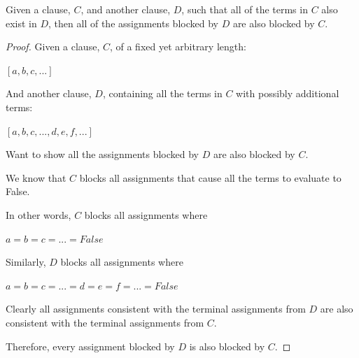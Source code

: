 \documentclass[manuscript]{acmart}
\begin{document}
    \begin{lemma}
        Given a clause, $C$, and another clause, $D$, such that all of the 
        terms in $C$ also exist in $D$, then all of the assignments
        blocked by $D$ are also blocked by $C$.
    \end{lemma}
    \begin{proof}
        Given a clause, $C$, of a fixed yet arbitrary length:

        $[a, b, c, ...]$

        And another clause, $D$, containing all the terms in $C$ with possibly
        additional terms:

        $[a, b, c, ..., d, e, f, ...]$

        Want to show all the assignments blocked by $D$ are also blocked by $C$.

        We know that $C$ blocks all assignments that cause all the terms to evaluate
        to False.

        In other words, $C$ blocks all assignments where 
 
        $a = b = c = ... = False$

        Similarly, $D$ blocks all assignments where

        $a = b = c = ... = d = e = f = ... = False$

        Clearly all assignments consistent with the terminal assignments from $D$
        are also consistent with the terminal assignments from $C$.

        Therefore, every assignment blocked by $D$ is also blocked by $C$.
    \end{proof}
\end{document}
